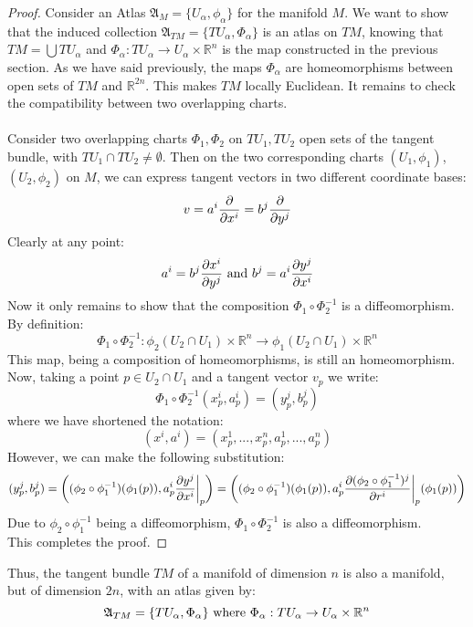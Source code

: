 \documentclass[12pt,a4paper]{report}
\theoremstyle{definition}
\theoremstyle{Theorem}
\theoremstyle{definition}
\theoremstyle{definition}
\begin{document}
	\begin{proof}
		Consider an Atlas $\mathfrak{A}_M=\{U_\alpha,\phi_\alpha\}$ for the manifold $M$. We want to show that the induced collection $\mathfrak{A}_{TM}=\{TU_\alpha,\Phi_\alpha\}$ is an atlas on $TM$, knowing that $TM=\bigcup TU_\alpha$ and $\Phi_\alpha:TU_\alpha\rightarrow U_\alpha\times \mathbb{R}^n$ is the map constructed in the previous section.
		As we have said previously, the maps $\Phi_\alpha$ are homeomorphisms between open sets of $TM$ and $\mathbb{R}^{2n}$. This makes $TM$ locally Euclidean. It remains to check the compatibility between two overlapping charts.\\
		\\
		Consider two overlapping charts $\Phi_1,\Phi_2$ on $TU_1,TU_2$ open sets of the tangent bundle, with $TU_1\cap TU_2\neq \emptyset$. Then on the two corresponding charts $(U_1,\phi_1)$, $(U_2,\phi_2)$ on $M$, we can express tangent vectors in two different coordinate bases:
		$$v=a^i{\partial\over \partial{x^i}}=b^j{\partial \over \partial y^j}$$
		Clearly at any point:
		$$a^i=b^j{\partial x^i\over\partial y^j} \hbox{ and } b^j=a^i{\partial y^j\over\partial x^i}$$
		Now it only remains to show that the composition $\Phi_1\circ \Phi_2^{-1}$ is a diffeomorphism.\\
		By definition:
		$$\Phi_1\circ \Phi_2^{-1}:\phi_2(U_2\cap U_1)\times \mathbb{R}^n\rightarrow \phi_1(U_2\cap U_1)\times \mathbb{R}^n$$
		This map, being a composition of homeomorphisms, is still an homeomorphism. Now, taking a point $p\in U_2\cap U_1$ and a tangent vector $v_p$ we write:
		$$\Phi_1\circ \Phi_2^{-1}(x^i_p,a^i_p)=(y^j_p,b^j_p)$$
		where we have shortened the notation:
		$$(x^i,a^i)=(x^1_p,...,x^n_p,a^1_p,...,a^n_p)$$
		However, we can make the following substitution:
		$$(y^j_p,b^j_p)=\bigg((\phi_2\circ \phi_1^{-1})(\phi_1(p)),a^i_p{\partial y^j\over\partial x^i}\bigg|_p\bigg)=\bigg((\phi_2\circ \phi_1^{-1})(\phi_1(p)),a^i_p{\partial (\phi_2\circ \phi_1^{-1})^j\over\partial r^i}\bigg|_p(\phi_1(p))\bigg)$$
		Due to $\phi_2\circ \phi_1^{-1}$ being a diffeomorphism, $\Phi_1\circ \Phi_2^{-1}$ is also a diffeomorphism.\\
		This completes the proof.
	\end{proof}
	Thus, the tangent bundle $TM$ of a manifold of dimension $n$ is also a manifold, but of dimension $2n$, with an atlas given by:
	$$\mathfrak{A}_{TM}=\{TU_\alpha,\Phi_\alpha\} \hbox{ where } \Phi_\alpha:TU_\alpha\rightarrow U_\alpha\times \mathbb{R}^n$$
\end{document}
